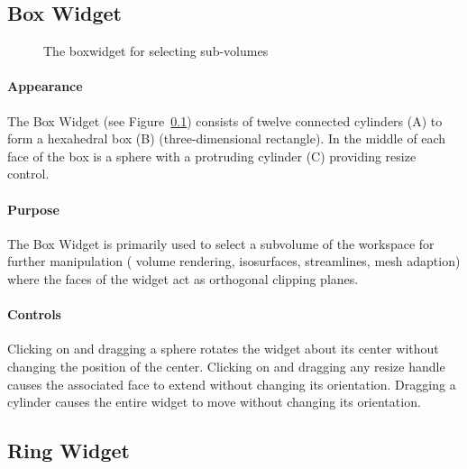 \subsection{Box Widget}
\label{sec:view-boxwidget} 

\begin{figure}[htb]
  \begin{makeimage}
  \end{makeimage}
  \boxwidget
  \caption{\label{fig:boxwidget} The boxwidget for selecting sub-volumes}
\end{figure}

\paragraph{Appearance} The Box
Widget (see Figure~\ref{sec:view-boxwidget}) consists of twelve 
connected cylinders (A) to form a hexahedral box (B) (three-dimensional
rectangle).  In the middle of each face of the box is a sphere with a protruding cylinder (C) providing resize control.

\paragraph{Purpose} The Box Widget is primarily used to select a
subvolume of the workspace for further manipulation (\eg{} volume
rendering, isosurfaces, streamlines, mesh adaption) where the faces of the
widget act as orthogonal clipping planes.

\paragraph{Controls} Clicking on and dragging a sphere rotates
the widget about its center without changing the position of the center.
Clicking on and dragging any resize handle
causes the associated face to extend without changing its orientation.
Dragging a cylinder causes the entire widget to move without changing its
orientation.

\subsection{Ring Widget}
\label{sec:view-ringwidget} 

